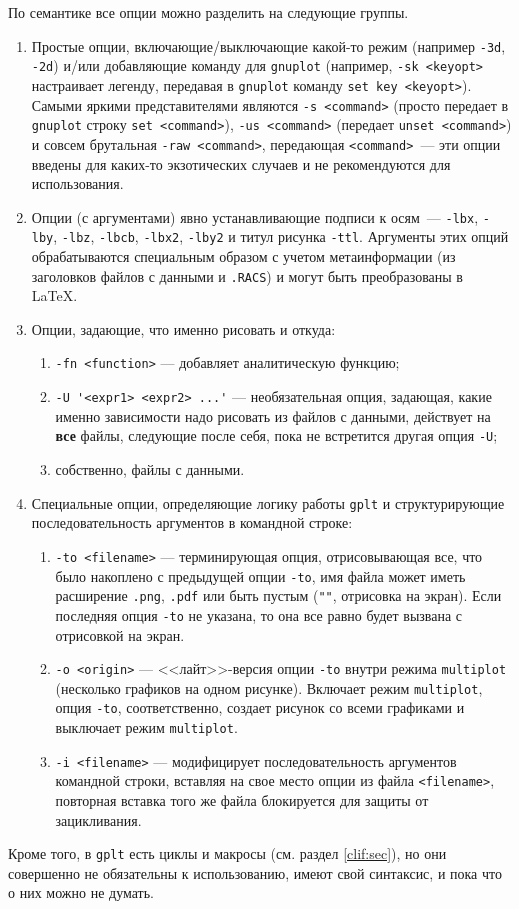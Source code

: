 \documentclass[12pt]{article}
\def\gplt{{\tt gplt}}
\def\gnuplot{{\tt gnuplot}}
\def\png{{\tt .png}}
\def\pdf{{\tt .pdf}}
\begin{document}
По семантике все опции можно разделить на следующие группы.
\begin{enumerate}
\item Простые опции, включающие/выключающие какой-то режим (например \verb'-3d', \verb'-2d')
  и/или добавляющие команду для \gnuplot{} (например, \verb'-sk <keyopt>' настраивает легенду, передавая в \gnuplot{} команду \verb'set key <keyopt>').
  Самыми яркими представителями являются \verb'-s <command>' (просто передает в \gnuplot{} строку \verb'set <command>'),
  \verb'-us <command>' (передает \verb'unset <command>') и совсем брутальная \verb'-raw <command>', передающая \verb'<command>'~---
  эти опции введены для каких-то экзотических случаев и не рекомендуются для использования. 
\item Опции (с аргументами) явно устанавливающие подписи к осям~--- \verb'-lbx', \verb'-lby', \verb'-lbz', \verb'-lbcb', \verb'-lbx2', \verb'-lby2'
  и титул рисунка \verb'-ttl'. Аргументы этих опций обрабатываются специальным образом с учетом метаинформации (из заголовков файлов с данными и \verb'.RACS') и
  могут быть преобразованы в \LaTeX{}.
\item Опции, задающие, что именно рисовать и откуда:
  \begin{enumerate}
  \item \verb'-fn <function>' --- добавляет аналитическую функцию;
  \item \verb|-U '<expr1> <expr2> ...'| --- необязательная опция, задающая, какие именно зависимости надо рисовать из файлов с данными, действует на {\bf все} файлы,
    следующие после себя, пока не встретится другая опция \verb'-U';
  \item собственно, файлы с данными. 
  \end{enumerate}
\item Специальные опции, определяющие логику работы \gplt{} и структурирующие последовательность аргументов в командной строке:
  \begin{enumerate}
  \item \verb'-to <filename>' --- терминирующая опция, отрисовывающая все, что было накоплено с предыдущей опции \verb'-to', имя файла может иметь расширение \png, \pdf{}
    или быть пустым (\verb|""|, отрисовка на экран). Если последняя опция \verb'-to' не указана, то она все равно будет вызвана с отрисовкой на экран.
  \item \verb'-o <origin>' --- <<лайт>>-версия опции \verb'-to' внутри режима \verb'multiplot' (несколько графиков на одном рисунке). Включает режим
    \verb'multiplot', опция \verb'-to', соответственно, создает рисунок со всеми графиками и выключает режим \verb'multiplot'.
  \item\verb'-i <filename>' --- модифицирует последовательность аргументов командной строки, вставляя на свое место опции из файла \verb'<filename>',
    повторная вставка того же файла блокируется для защиты от зацикливания.
  \end{enumerate}
\end{enumerate}
Кроме того, в \gplt{} есть циклы и макросы (см. раздел \ref{clif:sec}), но они совершенно не обязательны к использованию, имеют свой синтаксис, и пока что
о них можно не думать.
\newpage
\end{document}
